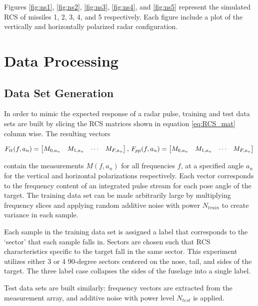     Figures \ref{fig:ns1}, \ref{fig:ns2}, \ref{fig:ns3}, \ref{fig:ns4}, and \ref{fig:ns5} represent the simulated RCS of missiles 1, 2, 3, 4, and 5 respectively. Each figure include a plot of the vertically and horizontally polarized radar configuration.


\section{Data Processing}

  \subsection{Data Set Generation}
    In order to mimic the expected response of a radar pulse, training and test data sets are built by slicing the RCS matrices shown in equation \ref{eq:RCS_mat} column wise. The resulting vectors

    \begin{equation}\label{eq:F_vec}
      F_{tt}(f, a_n) =
       \begin{bmatrix}
         M_{0, a_n} & M_{1,a_n} & \cdots & M_{F,a_n}
       \end{bmatrix},\,\,
       \\
     F_{pp}(f, a_n) =
      \begin{bmatrix}
        M_{0, a_n} & M_{1,a_n} & \cdots & M_{F,a_n}
      \end{bmatrix}
      \\
    \end{equation}

    contain the measurements $M(f, a_n)$ for all frequencies $f$, at a specified angle $a_n$ for the vertical and horizontal polarizations respectively. Each vector corresponds to the frequency content of an integrated pulse stream for each pose angle of the target. The training data set can be made arbitrarily large by multiplying frequency slices and applying random additive noise with power $N_{train}$ to create variance in each sample.

    Each sample in the training data set is assigned a label that corresponds to the `sector' that each sample falls in. Sectors are chosen such that RCS characteristics specific to the target fall in the same sector. This experiment utilizes either 3 or 4 90-degree sectors centered on the nose, tail, and sides of the target. The three label case collapses the sides of the fuselage into a single label.

    Test data sets are built similarly:  frequency vectors  are extracted from the measurement array, and additive noise with power level $N_{test}$ is applied.


